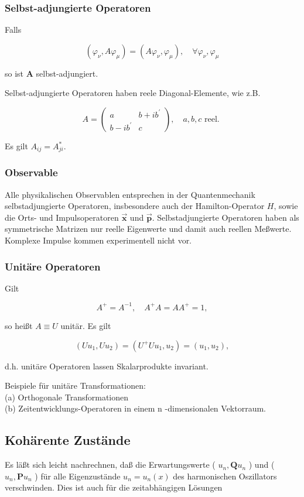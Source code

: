 \documentclass[10pt, letterpaper]{article}
\begin{document}
\subsubsection*{Selbst-adjungierte Operatoren}
Falls

$$
\left(\varphi_{\nu}, A \varphi_{\mu}\right)=\left(A \varphi_{\nu}, \varphi_{\mu}\right), \quad \forall \varphi_{\nu}, \varphi_{\mu}
$$

so ist $\mathbf{A}$ selbst-adjungiert.

Selbst-adjungierte Operatoren haben reele Diagonal-Elemente, wie z.B.

$$
A=\left(\begin{array}{cc}
a & b+i b^{\prime} \\
b-i b^{\prime} & c
\end{array}\right), \quad a, b, c \text { reel. }
$$

Es gilt $A_{i j}=A_{j i}^{*}$.

\subsubsection*{Observable}
Alle physikalischen Observablen entsprechen in der Quantenmechanik selbstadjungierte Operatoren, insbesondere auch der Hamilton-Operator $H$, sowie die Orts- und Impulsoperatoren $\overrightarrow{\mathbf{x}}$ und $\overrightarrow{\mathbf{p}}$. Selbstadjungierte Operatoren haben als symmetrische Matrizen nur reelle Eigenwerte und damit auch reellen Meßwerte. Komplexe Impulse kommen experimentell nicht vor.

\subsubsection*{Unitäre Operatoren}
Gilt

$$
A^{+}=A^{-1}, \quad A^{+} A=A A^{+}=1,
$$

so heißt $A \equiv U$ unitär. Es gilt

$$
\left(U u_{1}, U u_{2}\right)=\left(U^{+} U u_{1}, u_{2}\right)=\left(u_{1}, u_{2}\right),
$$

d.h. unitäre Operatoren lassen Skalarprodukte invariant.

Beispiele für unitäre Transformationen:\\
(a) Orthogonale Transformationen\\
(b) Zeitentwicklungs-Operatoren in einem n -dimensionalen Vektorraum.

\subsection*{Kohärente Zustände}
Es läßt sich leicht nachrechnen, daß die Erwartungswerte ( $u_{n}, \mathbf{Q} u_{n}$ ) und ( $u_{n}, \mathbf{P} u_{n}$ ) für alle Eigenzustände $u_{n}=u_{n}(x)$ des harmonischen Oszillators verschwinden. Dies ist auch für die zeitabhängigen Lösungen
\end{document}
